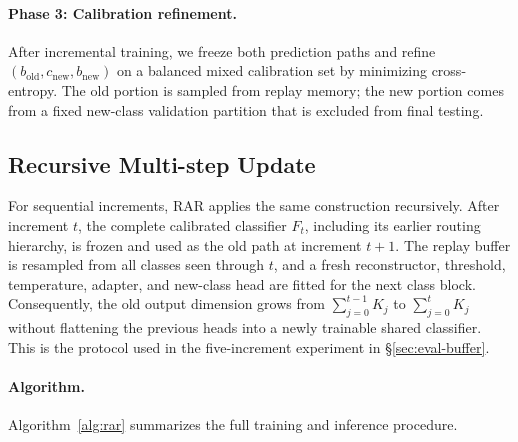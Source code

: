 \paragraph{Phase 3: Calibration refinement.}
After incremental training, we freeze both prediction paths and refine $(b_{\mathrm{old}}, c_{\mathrm{new}}, b_{\mathrm{new}})$ on a balanced mixed calibration set by minimizing cross-entropy. The old portion is sampled from replay memory; the new portion comes from a fixed new-class validation partition that is excluded from final testing.

\subsection{Recursive Multi-step Update}\label{sec:multistep}
For sequential increments, RAR applies the same construction recursively. After increment $t$, the complete calibrated classifier $F_t$, including its earlier routing hierarchy, is frozen and used as the old path at increment $t+1$. The replay buffer is resampled from all classes seen through $t$, and a fresh reconstructor, threshold, temperature, adapter, and new-class head are fitted for the next class block. Consequently, the old output dimension grows from $\sum_{j=0}^{t-1}K_j$ to $\sum_{j=0}^{t}K_j$ without flattening the previous heads into a newly trainable shared classifier. This is the protocol used in the five-increment experiment in \S\ref{sec:eval-buffer}.

\paragraph{Algorithm.}
Algorithm~\ref{alg:rar} summarizes the full training and inference procedure.


